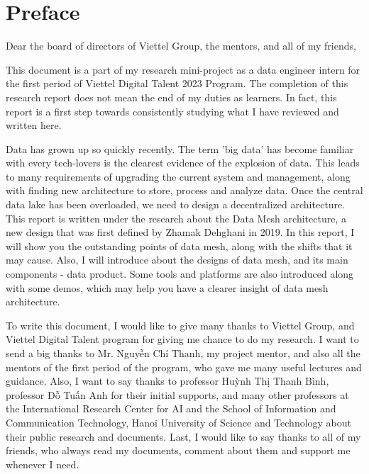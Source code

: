 \documentclass[12pt, a4paper]{book}
\begin{document}
 
	
    \raggedbottom
    \clearpage
    \thispagestyle{empty}
    
    \begingroup
    \normalsize
    

\chapter*{Preface}
{}

\justifying
{}
Dear the board of directors of Viettel Group, the mentors, and all of my friends,

This document is a part of my research mini-project as a data engineer intern for the first period of Viettel Digital Talent 2023 Program. The completion of this research report does not mean the end of my duties as learners. In fact, this report is a first step towards consistently studying what I have reviewed and written here.

Data has grown up so quickly recently. The term 'big data' has become familiar with every tech-lovers is the clearest evidence of the explosion of data. This leads to many requirements of upgrading the current system and management, along with finding new architecture to store, process and analyze data. Once the central data lake has been overloaded, we need to design a decentralized architecture. This report is written under the research about the Data Mesh architecture, a new design that was first defined by Zhamak Dehghani in 2019. In this report, I will show you the outstanding points of data mesh, along with the shifts that it may cause. Also, I will introduce about the designs of data mesh, and its main components - data product. Some tools and platforms are also introduced along with some demos, which may help you have a clearer insight of data mesh architecture.

To write this document, I would like to give many thanks to Viettel Group, and Viettel Digital Talent program for giving me chance to do my research. I want to send a big thanks to Mr. Nguyễn Chí Thanh, my project mentor, and also all the mentors of the first period of the program, who gave me many useful lectures and guidance. Also, I want to say thanks to professor Huỳnh Thị Thanh Bình, professor Đỗ Tuấn Anh for their initial supports, and many other professors at the International Research Center for AI and the School of Information and Communication Technology, Hanoi University of Science and Technology about their public research and documents. Last, I would like to say thanks to all of my friends, who always read my documents, comment about them and support me whenever I need.
\end{document}
